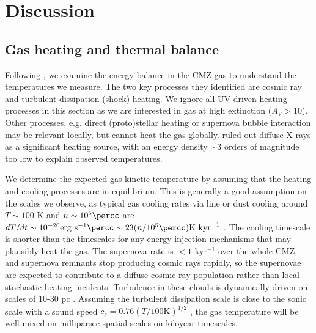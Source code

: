 

\clearpage
\section{Discussion}
\label{sec:discussion}
\subsection{Gas heating and thermal balance}
\label{sec:heating}
Following \citet{Ao2013a}, we examine the energy balance in the CMZ gas to
understand the temperatures we measure.  The two key processes they identified
are cosmic ray and turbulent dissipation (shock) heating.  We ignore all UV-driven
heating processes in this section as we are interested in gas at high
extinction ($A_V > 10$).  Other processes, e.g. direct (proto)stellar heating
or supernova bubble interaction may be relevant locally, but cannot heat the
gas globally.  \citet{Ao2013a} ruled out diffuse X-rays as a significant
heating source, with an energy density $\sim3$ orders of magnitude too low to
explain observed temperatures.

We determine the expected gas kinetic temperature by assuming that the heating
and cooling processes are in equilibrium.  This is generally a good assumption
on the scales we observe, as typical gas cooling rates via line or dust cooling
around $T\sim100$ K and $n\sim10^5\percc$ are $dT/dt \sim 10^{-20}
\mathrm{erg~s}^{-1}\percc \sim 23 (n/10^5 \percc) \mathrm{K~kyr}^{-1}$
\citep[][and see below]{Goldsmith2001a}.  The cooling timescale is shorter than
the timescales for any energy injection mechanisms that may plausibly heat the
gas.  The supernova rate is $<1$ kyr$^{-1}$ over the whole CMZ, and supernova
remnants stop producing cosmic rays rapidly, so the supernovae are
expected to contribute to a diffuse cosmic ray population rather than local
stochastic heating incidents.  Turbulence in these clouds is dynamically driven
on scales of 10-30 pc \citep{Kruijssen2015a}.  Assuming the turbulent
dissipation scale is close to the sonic scale with a sound speed $c_s = 0.76
(T/100\mathrm{K})^{1/2}$ \kms, the gas temperature will be well mixed on milliparsec
spatial scales on kiloyear timescales.

